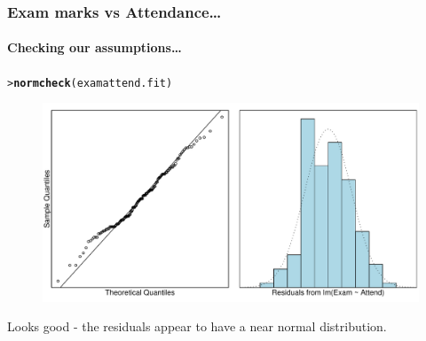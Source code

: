 \documentclass{beamer}\usepackage[]{graphicx}\usepackage[]{xcolor}
\makeatletter
\newcommand{\hlstd}[1]{\textcolor[rgb]{0.345,0.345,0.345}{#1}}%
\newcommand{\hlkwd}[1]{\textcolor[rgb]{0.737,0.353,0.396}{\textbf{#1}}}%
\newenvironment{kframe}{%
 \def\at@end@of@kframe{}%
 \ifinner\ifhmode%
  \def\at@end@of@kframe{\end{minipage}}%
  \begin{minipage}{\columnwidth}%
 \fi\fi%
 \def\FrameCommand##1{\hskip\@totalleftmargin \hskip-\fboxsep
 \colorbox{shadecolor}{##1}\hskip-\fboxsep
     \hskip-\linewidth \hskip-\@totalleftmargin \hskip\columnwidth}%
 \MakeFramed {\advance\hsize-\width
   \@totalleftmargin\z@ \linewidth\hsize
   \@setminipage}}%
 {\par\unskip\endMakeFramed%
 \at@end@of@kframe}
\newenvironment{knitrout}{}{} %
\makeatother
\begin{document}
\begin{frame}[fragile]
\frametitle{Exam marks vs Attendance\ldots}
\framesubtitle{Checking our assumptions\ldots}
\medskip


\begin{knitrout}\scriptsize
{}\color{fgcolor}\begin{kframe}
\begin{alltt}
\hlstd{> }\hlkwd{normcheck}\hlstd{(examattend.fit)}
\end{alltt}
\end{kframe}
\end{knitrout}



\begin{figure}
  \centering
  \includegraphics[scale=0.5]{figure/RC-H05-018}
\end{figure}

Looks good - the residuals appear to have a near normal distribution. 
\end{frame}
\end{document}
